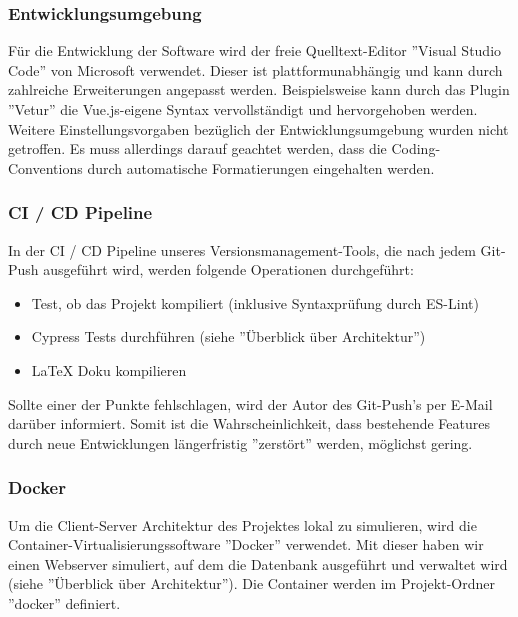 \documentclass[twoside]{report}
\begin{document}
\subsubsection{Entwicklungsumgebung}
Für die Entwicklung der Software wird der freie Quelltext-Editor ''Visual Studio Code''
von Microsoft verwendet. Dieser ist plattformunabhängig und kann durch zahlreiche Erweiterungen
angepasst werden. Beispielsweise kann durch das Plugin ''Vetur'' die Vue.js-eigene Syntax
vervollständigt und hervorgehoben werden.
\\Weitere Einstellungsvorgaben bezüglich der Entwicklungsumgebung wurden nicht getroffen.
Es muss allerdings darauf geachtet werden, dass die Coding-Conventions durch automatische
Formatierungen eingehalten werden.

\subsubsection{CI / CD Pipeline}
In der CI / CD Pipeline unseres Versionsmanagement-Tools, die nach jedem Git-Push
ausgeführt wird, werden folgende Operationen durchgeführt:
\begin{itemize}
  \item Test, ob das Projekt kompiliert (inklusive Syntaxprüfung durch ES-Lint)
  \item Cypress Tests durchführen (siehe ''Überblick über Architektur'')
  \item LaTeX Doku kompilieren
\end{itemize}

Sollte einer der Punkte fehlschlagen, wird der Autor des Git-Push's per E-Mail
darüber informiert. Somit ist die Wahrscheinlichkeit, dass bestehende Features durch
neue Entwicklungen längerfristig ''zerstört'' werden, möglichst gering.

\subsubsection{Docker}
Um die Client-Server Architektur des Projektes lokal zu simulieren, wird die
Container-Virtualisierungssoftware ''Docker'' verwendet.
Mit dieser haben wir einen Webserver simuliert, auf dem die Datenbank ausgeführt
und verwaltet wird (siehe ''Überblick über Architektur''). Die Container werden
im Projekt-Ordner ''docker'' definiert.
\end{document}
